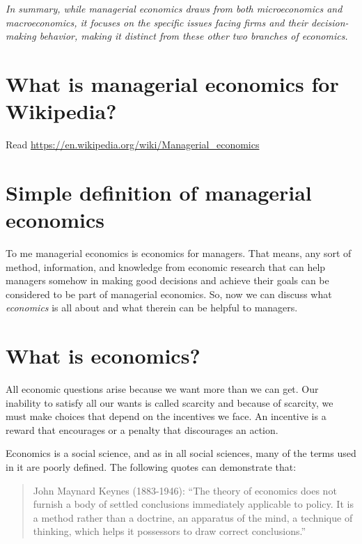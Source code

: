 \documentclass[
  12pt,
  oneside]{book}
\theoremstyle{definition}
\theoremstyle{definition}
\theoremstyle{definition}
\theoremstyle{definition}
\theoremstyle{remark}
\begin{document}
\emph{In summary, while managerial economics draws from both microeconomics and macroeconomics, it focuses on the specific issues facing firms and their decision-making behavior, making it distinct from these other two branches of economics.}

\section{What is managerial economics for Wikipedia?}\label{what-is-managerial-economics-for-wikipedia}

Read \url{https://en.wikipedia.org/wiki/Managerial_economics}

\section{Simple definition of managerial economics}\label{simple-definition-of-managerial-economics}

To me managerial economics is economics for managers. That means, any sort of method, information, and knowledge from economic research that can help managers somehow in making good decisions and achieve their goals can be considered to be part of managerial economics. So, now we can discuss what \emph{economics} is all about and what therein can be helpful to managers.

\section{What is economics?}\label{what-is-economics}

All economic questions arise because we want more than we can get. Our inability to satisfy all our wants is called scarcity and because of scarcity, we must make choices that depend on the incentives we face. An incentive is a reward that encourages or a penalty that discourages an action.

Economics is a social science, and as in all social sciences, many of the terms used in it are poorly defined. The following quotes can demonstrate that:

\begin{quote}
John Maynard Keynes (1883-1946): ``The theory of economics does not furnish a body of settled conclusions immediately applicable to policy. It is a method rather than a doctrine, an apparatus of the mind, a technique of thinking, which helps it possessors to draw correct conclusions.'' \citet{Keynes1921Introduction}
\end{quote}
\end{document}
